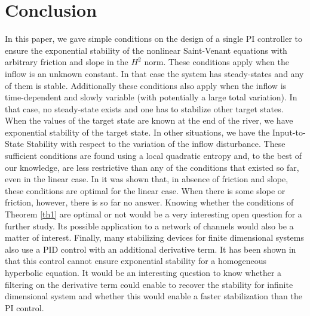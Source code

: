 \documentclass[JEP,XML,SOM,Unicode]{cedram}
\theoremstyle{definition}
\begin{document}
\section{Conclusion}
In this paper, we gave simple conditions on the design of a single PI controller to ensure
the exponential stability of the nonlinear Saint-Venant equations with arbitrary friction and slope in the $H^{2}$ norm.
These conditions apply when the inflow is an unknown constant{. I}n that case the system has steady-states and any of them is stable. {Additionally these conditions} also apply when
the inflow is time-dependent and slowly variable (with potentially a large total variation). In that case, no steady-state exists and one has to stabilize other target states.
When the values of the target state are known at the end of the river, we have exponential stability of the target state.
{In other situations}, we have the Input-to-State Stability with respect to the variation of the inflow disturbance.
These sufficient conditions are found using a local quadratic entropy
and, to the best of our knowledge, are less restrictive than any of the conditions that existed so far, even in the linear case.
In \cite{BastinCoronTamasoiu2015} it was shown that, in absence of friction and slope, these conditions {are} optimal for the linear case. When there is some slope or friction, however, there is so far no answer{. Knowing }whether the conditions of Theorem \ref{th1} are optimal or not would be a very interesting {open question} for a further study. {Its possible application to a network of channels would also be a matter of interest.
Finally, many stabilizing devices for finite dimensional systems also use a PID control with an additional derivative term.
It has been shown in \cite{CoronTamasoiu2015} that this control cannot ensure exponential stability for a homogeneous hyperbolic equation.
It would be an interesting question to know whether a filtering on the derivative term could enable to recover the stability for infinite dimensional system and whether this would enable a faster stabilization than the PI control.}

\appendix
\end{document}
